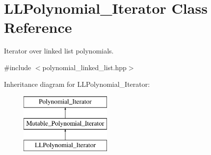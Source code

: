 \hypertarget{class_l_l_polynomial___iterator}{}\section{L\+L\+Polynomial\+\_\+\+Iterator Class Reference}
\label{class_l_l_polynomial___iterator}


Iterator over linked list polynomials.  




{\ttfamily \#include $<$polynomial\+\_\+linked\+\_\+list.\+hpp$>$}

Inheritance diagram for L\+L\+Polynomial\+\_\+\+Iterator\+:\begin{figure}[H]
\begin{center}
\leavevmode
\includegraphics[height=3.000000cm]{class_l_l_polynomial___iterator}
\end{center}
\end{figure}
